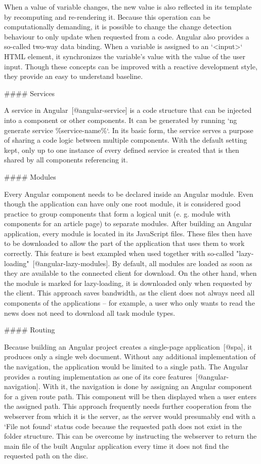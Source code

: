 \documentclass[
  digital, %
  oneside, %
  lof,     %
  nolot,     %
]{fithesis4}
\begin{document}
When a value of variable changes, the new value is also reflected in its template by recomputing and re-rendering it. Because this operation can be computationally demanding, it is possible to change the change detection behaviour to only update when requested from a code. Angular also provides a so-called two-way data binding. When a variable is assigned to an `<input>` \acrshort{HTML} element, it synchronizes the variable's value with the value of the user input. Though these concepts can be improved with a reactive development style, they provide an easy to understand baseline.

#### Services

A service in Angular~[@angular-service] is a code structure that can be injected into a component or other components. It can be generated by running `ng generate service \%service-name\%`. In its basic form, the service serves a purpose of sharing a code logic between multiple components. With the default setting kept, only up to one instance of every defined service is created that is then shared by all components referencing it.

#### Modules

Every Angular component needs to be declared inside an Angular module. Even though the application can have only one root module, it is considered good practice to group components that form a logical unit (e. g. module with components for an article page) to separate modules. After building an Angular application, every module is located in its JavaScript files. These files then have to be downloaded to allow the part of the application that uses them to work correctly. This feature is best exampled when used together with so-called "lazy-loading"~[@angular-lazy-modules]. By default, all modules are loaded as soon as they are available to the connected client for download. On the other hand, when the module is marked for lazy-loading, it is downloaded only when requested by the client. This approach saves bandwidth, as the client does not always need all components of the applications -- for example, a user who only wants to read the news does not need to download all task module types.

#### Routing

Because building an Angular project creates a single-page application~[@spa], it produces only a single web document. Without any additional implementation of the navigation, the application would be limited to a single path. The Angular provides a routing implementation as one of its core features~[@angular-navigation]. With it, the navigation is done by assigning an Angular component for a given route path. This component will be then displayed when a user enters the assigned path. This approach frequently needs further cooperation from the webserver from which it is the server, as the server would presumably end with a `File not found` status code because the requested path does not exist in the folder structure. This can be overcome by instructing the webserver to return the main file of the built Angular application every time it does not find the requested path on the disc.
\end{document}
